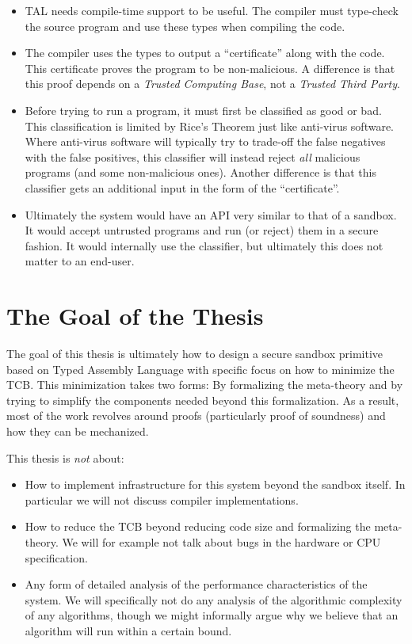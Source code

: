 \begin{itemize}
\item TAL needs compile-time support to be useful. The compiler must type-check
  the source program and use these types when compiling the code.

\item The compiler uses the types to output a ``certificate'' along with the
  code. This certificate proves the program to be non-malicious. A difference is
  that this proof depends on a \emph{Trusted Computing Base}, not a
  \emph{Trusted Third Party}.

\item Before trying to run a program, it must first be classified as good or
  bad. This classification is limited by Rice's Theorem just like anti-virus
  software. Where anti-virus software will typically try to trade-off the false
  negatives with the false positives, this classifier will instead reject
  \emph{all} malicious programs (and some non-malicious ones). Another
  difference is that this classifier gets an additional input in the form of the
  ``certificate''.

\item Ultimately the system would have an API very similar to that of a
  sandbox. It would accept untrusted programs and run (or reject) them in a
  secure fashion. It would internally use the classifier, but ultimately this
  does not matter to an end-user.
\end{itemize}

\section{The Goal of the Thesis}
\label{sec:goal}

The goal of this thesis is ultimately how to design a secure sandbox primitive
based on Typed Assembly Language with specific focus on how to minimize the
TCB. This minimization takes two forms: By formalizing the meta-theory and by
trying to simplify the components needed beyond this formalization. As a result,
most of the work revolves around proofs (particularly proof of soundness) and
how they can be mechanized.

This thesis is \emph{not} about:

\begin{itemize}
\item How to implement infrastructure for this system beyond the sandbox
  itself. In particular we will not discuss compiler implementations.
\item How to reduce the TCB beyond reducing code size and formalizing the
  meta-theory. We will for example not talk about bugs in the hardware or CPU
  specification.
\item Any form of detailed analysis of the performance characteristics of the
  system.  We will specifically not do any analysis of the algorithmic
  complexity of any algorithms, though we might informally argue why we believe
  that an algorithm will run within a certain bound.
\end{itemize}

